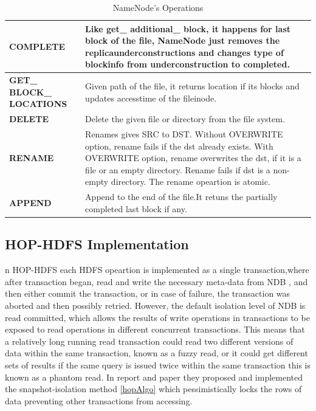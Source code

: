 \begin{table}[t]
\begin{tabular}{|l|p{12cm}|}
\hline
\textbf{COMPLETE}& Like  get\_ additional\_ block,  it  happens   for  last
    block   of  the  file,  NameNode  just  removes   the
          replicaunderconstructions   and  changes   type  of
               blockinfo from underconstruction to completed.
 \\
\hline
\textbf{GET\_ BLOCK\_ LOCATIONS}& Given  path  of  the  file,  it  returns   location  if  its
        blocks and updates accesstime of the fileinode.
 \\ 
 \hline
 \textbf{DELETE} & Delete the given file or directory from the file system.\\
 \hline
 \textbf{RENAME} & Renames gives SRC to DST. Without OVERWRITE option, rename fails if the dst already exists. With OVERWRITE option, rename overwrites the dst, if it is a file 
    or an empty directory. Rename fails if dst is a non-empty directory. The rename opeartion is atomic.\\
\hline 
 \textbf{APPEND} & Append to the end of the file.It retuns the partially completed last block if any. \\
 \hline
\end{tabular}
\caption{NameNode's Operations}
\label{NameNode_Ops}
\end{table}

\subsection{HOP-HDFS Implementation}
n HOP-HDFS each HDFS opeartion is implemented as a single transaction,where after transaction began, read and write the necessary meta-data from NDB , and then either commit the transaction, or in case of failure, the transaction was aborted and then possibly retried. However,  the  default  isolation  level  of  NDB  is   read  committed,  which  allows   the  results   of
write  operations   in  transactions   to  be  exposed  to  read  operations   in  different  concurrent
transactions.  This   means   that  a  relatively   long  running  read  transaction  could  read  two
different  versions   of  data  within  the  same  transaction,  known  as  a fuzzy  read, or it could get
different  sets   of  results   if the same query  is  issued twice within the same transaction  this  is
known as a phantom read. In report\cite{12} and paper \cite{hoppaper} they proposed and implemented the snapshot-isolation method \ref{hopAlgo} which pessimistically locks the rows of data preventing other transactions from accessing. 

